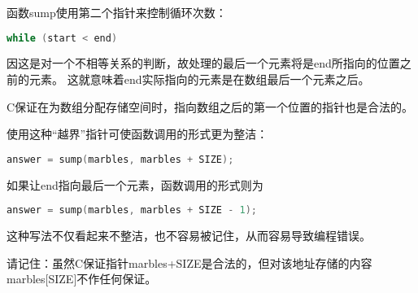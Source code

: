 \begin{frame}[fragile]
函数{\tf sump}使用第二个指针来控制循环次数：
\begin{lstlisting}[language=c,backgroundcolor=\color{red!20}]
while (start < end)
\end{lstlisting}
因这是对一个不相等关系的判断，故处理的最后一个元素将是{\tf end}所指向的位置之前的元素。
这就意味着{\tf end}实际指向的元素是在数组最后一个元素之后。\vspace{0.1in}\pause

\textcolor{acolor1}{C保证在为数组分配存储空间时，指向数组之后的第一个位置的指针也是合法的。}
\vspace{0.1in}\pause

使用这种“越界”指针可使函数调用的形式更为整洁：
\begin{lstlisting}[language=c,backgroundcolor=\color{red!20}]
answer = sump(marbles, marbles + SIZE);
\end{lstlisting}
\end{frame}

\begin{frame}[fragile]
如果让{\tf end}指向最后一个元素，函数调用的形式则为
\begin{lstlisting}[language=c,backgroundcolor=\color{red!20}]
answer = sump(marbles, marbles + SIZE - 1);
\end{lstlisting}
这种写法不仅看起来不整洁，也不容易被记住，从而容易导致编程错误。
\vspace{0.1in}\pause

\textcolor{acolor1}{请记住：虽然C保证指针{\tf marbles+SIZE}是合法的，但对该地址存储的内容{\tf marbles[SIZE]}不作任何保证。}
\end{frame}

